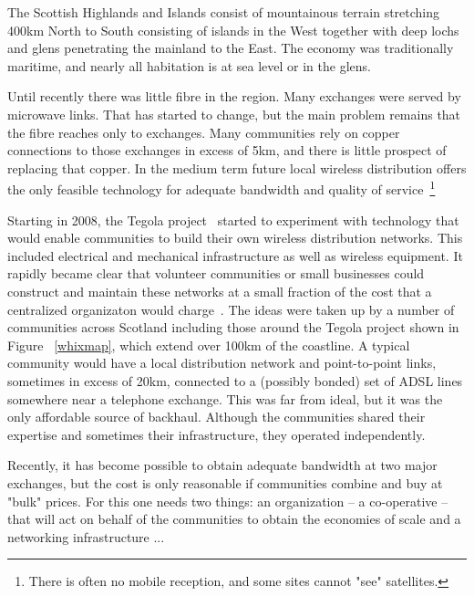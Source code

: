 
The Scottish Highlands and Islands consist of mountainous  terrain stretching 400km North to South consisting of islands in the West together with deep lochs and glens penetrating the mainland to the East.  The economy was traditionally maritime, and nearly all habitation is at sea level or in the glens.  

Until recently there was little fibre in the region.  Many exchanges were served by microwave links. That has started to change, but the main problem remains that the fibre reaches only to exchanges.  Many communities rely on copper connections to those exchanges in excess of 5km, and there is little prospect of replacing that copper.  In the medium term future local wireless distribution offers the only feasible technology for adequate bandwidth and quality of service~\footnote{There is often no mobile reception, and some sites cannot "see" satellites.}

Starting in 2008, the Tegola project~\cite{tegola} started to experiment with technology that would enable communities to build their own wireless distribution networks.  This included electrical and mechanical infrastructure as well as wireless equipment.  It rapidly became clear that volunteer communities or small businesses could construct and maintain these networks at a small fraction of the cost that a centralized organizaton would charge~. The ideas were taken up by a number of communities across Scotland including those around the Tegola project shown in Figure ~\ref{whixmap}, which extend over 100km of the coastline. A typical community would have a local distribution network and point-to-point links, sometimes in excess of 20km, connected to a (possibly bonded) set of ADSL lines somewhere near a telephone exchange. This was far from ideal, but it was the only affordable source of backhaul. Although the communities shared their expertise and sometimes their infrastructure, they operated independently.


Recently, it has become possible to obtain adequate bandwidth at two major exchanges, but the cost is only reasonable if communities combine and buy at "bulk" prices.  For this one needs two things: an organization -- a co-operative -- that will act on behalf of the communities to obtain the economies of scale and a networking infrastructure ...

